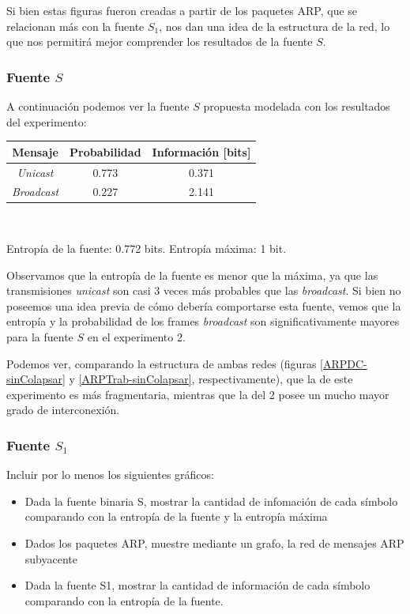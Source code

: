 \par Si bien estas figuras fueron creadas a partir de los paquetes ARP, que se relacionan más con la fuente $S_1$, nos dan una idea de la estructura de la red, lo que nos permitirá mejor comprender los resultados de la fuente $S$.

\subsubsection{Fuente $S$}

\par A continuación podemos ver la fuente $S$ propuesta modelada con los resultados del experimento: \\

\begin{tabular}{ | c | c | c |}
    \hline
    Mensaje & Probabilidad & Información [bits] \\
    \hline
    \textit{Unicast} & 0.773 & 0.371 \\
    \hline
    \textit{Broadcast} & 0.227 & 2.141 \\
    \hline
\end{tabular} \\

\par Entropía de la fuente: 0.772 bits. Entropía máxima: 1 bit.

\par Observamos que la entropía de la fuente es menor que la máxima, ya que las transmisiones \textit{unicast} son casi 3 veces más probables que las \textit{broadcast}.
Si bien no poseemos una idea previa de cómo debería comportarse esta fuente, vemos que la entropía y la probabilidad de los frames \textit{broadcast} son significativamente mayores para la fuente $S$ en el experimento 2.

\par Podemos ver, comparando la estructura de ambas redes (figuras \ref{ARPDC-sinColapsar} y \ref{ARPTrab-sinColapsar}, respectivamente), que la de este experimento es más fragmentaria, mientras que la del 2 posee un mucho mayor grado de interconexión.

\subsubsection{Fuente $S_1$}

Incluir por lo menos los siguientes gr\'aficos:

\begin{itemize}
	\item Dada la fuente binaria S, mostrar la cantidad de infomación de cada símbolo comparando con la entropía de la fuente y la entropía máxima
	\item Dados los paquetes ARP, muestre mediante un grafo, la red de mensajes ARP subyacente
	\item Dada la fuente S1, mostrar la cantidad de información de cada símbolo comparando con la entropía de la fuente.
\end{itemize}

